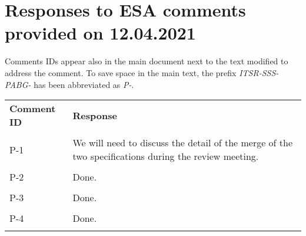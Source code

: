 
\section{Responses to ESA comments provided on 12.04.2021}
\label{sec:ESA:comments:1}

Comments IDs appear also in the main document next to the text modified to address the comment. To save space in the main text, the prefix \emph{ITSR-SSS-PABG-} has been abbreviated as \emph{P-}.

\setlength\LTleft{0pt}
\setlength\LTright{0pt}
\tiny 
\begin{longtable}{|p{1.5cm}|p{12cm}|@{}}
\textbf{Comment ID}&\textbf{Response}\\
\\
\hline
P-1&
\begin{minipage}{12cm}
We will need to discuss the detail of the merge of the two specifications during the review meeting.
\end{minipage}\\
\\
\hline

P-2&
\begin{minipage}{12cm}
Done.
\end{minipage}\\
\\
\hline

P-3&
\begin{minipage}{12cm}
Done.
\end{minipage}\\
\\
\hline

P-4&
\begin{minipage}{12cm}
Done.
\end{minipage}\\
\\
\hline
                                                
\end{longtable}
\normalsize

\clearpage